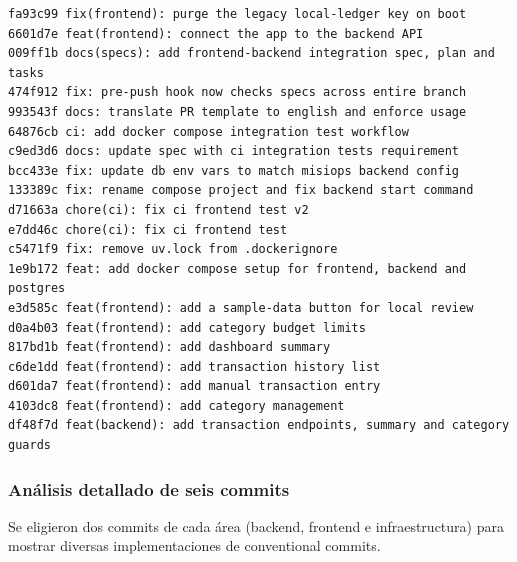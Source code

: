 \begin{lstlisting}[caption={\texttt{git log fa93c99 --oneline --no-merges -20}},label={lst:log}]
fa93c99 fix(frontend): purge the legacy local-ledger key on boot
6601d7e feat(frontend): connect the app to the backend API
009ff1b docs(specs): add frontend-backend integration spec, plan and tasks
474f912 fix: pre-push hook now checks specs across entire branch
993543f docs: translate PR template to english and enforce usage
64876cb ci: add docker compose integration test workflow
c9ed3d6 docs: update spec with ci integration tests requirement
bcc433e fix: update db env vars to match misiops backend config
133389c fix: rename compose project and fix backend start command
d71663a chore(ci): fix ci frontend test v2
e7dd46c chore(ci): fix ci frontend test
c5471f9 fix: remove uv.lock from .dockerignore
1e9b172 feat: add docker compose setup for frontend, backend and postgres
e3d585c feat(frontend): add a sample-data button for local review
d0a4b03 feat(frontend): add category budget limits
817bd1b feat(frontend): add dashboard summary
c6de1dd feat(frontend): add transaction history list
d601da7 feat(frontend): add manual transaction entry
4103dc8 feat(frontend): add category management
df48f7d feat(backend): add transaction endpoints, summary and category guards
\end{lstlisting}

\subsubsection*{Análisis detallado de seis commits}
Se eligieron dos commits de cada área (backend, frontend e infraestructura) para mostrar diversas implementaciones de conventional commits.

